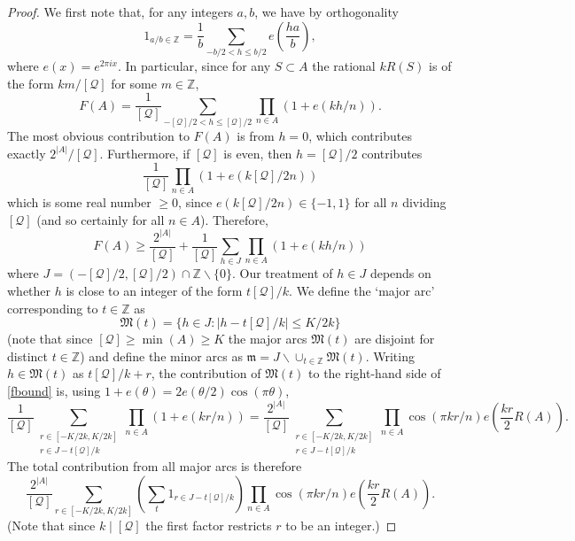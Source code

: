 \documentclass[12pt]{amsart}
\newcommand{\bbz}{\mathbb{Z}}
\newcommand{\abs}[1]{\left\lvert #1\right\rvert}
\newcommand{\brac}[1]{\left( #1\right)}
\begin{document}
\begin{proof}
We first note that, for any integers $a,b$, we have by orthogonality
\[1_{a/b\in \bbz} = \frac{1}{b}\sum_{-b/2< h\leq b/2}e\brac{\frac{ha}{b}},\]
where $e(x)=e^{2\pi ix}$. In particular, since for any $S\subset A$ the rational $kR(S)$ is of the form $km/[\mathcal{Q}]$ for some $m\in \bbz$, 
\[F(A)= \frac{1}{[\mathcal{Q}]}\sum_{-[\mathcal{Q}]/2< h\leq [\mathcal{Q}]/2}\prod_{n\in A}(1+e(kh/n)).\]
The most obvious contribution to $F(A)$ is from $h=0$, which contributes exactly $2^{\abs{A}}/[\mathcal{Q}]$. Furthermore, if $[\mathcal{Q}]$ is even, then $h=[\mathcal{Q}]/2$ contributes
\[\frac{1}{[\mathcal{Q}]}\prod_{n\in A}(1+e(k[\mathcal{Q}]/2n))\]
which is some real number $\geq 0$, since $e(k[\mathcal{Q}]/2n)\in \{-1,1\}$ for all $n$ dividing $[\mathcal{Q}]$ (and so certainly for all $n\in A$). Therefore,
\begin{equation}\label{fbound}
F(A)\geq \frac{2^{\abs{A}}}{[\mathcal{Q}]}+\frac{1}{[\mathcal{Q}]}\sum_{h\in J}\prod_{n\in A}(1+e(kh/n))
\end{equation}
where $J= (-[\mathcal{Q}]/2,[\mathcal{Q}]/2)\cap \bbz\backslash \{0\}$. Our treatment of $h\in J$ depends on whether $h$ is close to an integer of the form $t[\mathcal{Q}]/k$. We define the `major arc' corresponding to $t\in\bbz$ as
\[\mathfrak{M}(t) = \{ h\in J : \abs{h-t[\mathcal{Q}]/k}\leq K/2k\}\]
(note that since $[\mathcal{Q}] \geq \min(A)\geq K$ the major arcs $\mathfrak{M}(t)$ are disjoint for distinct $t\in\bbz$) and define the minor arcs as $\mathfrak{m} = J\backslash \cup_{t\in \bbz}\mathfrak{M}(t)$. Writing $h\in\mathfrak{M}(t)$ as $t[\mathcal{Q}]/k+r$, the contribution of $\mathfrak{M}(t)$ to the right-hand side of \eqref{fbound} is, using  $1+e(\theta)=2e(\theta/2)\cos(\pi \theta)$,
\[ \frac{1}{[\mathcal{Q}]}\sum_{\substack{r\in  [-K/2k,K/2k]\\ r\in J-t[\mathcal{Q}]/k} }\prod_{n\in A}(1+e(kr/n))=\frac{2^{\abs{A}}}{[\mathcal{Q}]}\sum_{\substack{r\in  [-K/2k,K/2k]\\ r\in J-t[\mathcal{Q}]/k} }\prod_{n\in A}\cos(\pi kr/n)e\brac{ \frac{kr}{2}R(A)}.\]
The total contribution from all major arcs is therefore
\[\frac{2^{\abs{A}}}{[\mathcal{Q}]}\sum_{r\in [-K/2k,K/2k]}\brac{\sum_{t}1_{r\in J-t[\mathcal{Q}]/k}}\prod_{n\in A}\cos(\pi kr/n)e\brac{ \frac{kr}{2}R(A)}.\]
(Note that since $k\mid [\mathcal{Q}]$ the first factor restricts $r$ to be an integer.) 


\end{proof}
\end{document}
